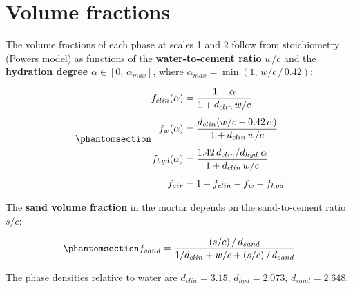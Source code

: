 \documentclass[
  a4paper,
  numbers=noendperiod,
  DIV=12]{scrreprt}
\begin{document}
\section{Volume fractions}\label{sec-pichler-volfracs}

The volume fractions of each phase at scales 1 and 2 follow from
stoichiometry (Powers model) as functions of the \textbf{water-to-cement
ratio} \(w/c\) and the \textbf{hydration degree}
\(\alpha \in [0,\,\alpha_{max}]\), where
\(\alpha_{max} = \min(1,\, w/c\,/\,0.42)\):

\begin{equation}\protect\phantomsection\label{eq-volfracs-cp}{
\begin{aligned}
f_{clin}(\alpha) &= \frac{1-\alpha}{1+d_{clin}\,w/c} \\[4pt]
f_w(\alpha) &= \frac{d_{clin}(w/c - 0.42\,\alpha)}{1+d_{clin}\,w/c} \\[4pt]
f_{hyd}(\alpha) &= \frac{1.42\,d_{clin}/d_{hyd}\;\alpha}{1+d_{clin}\,w/c} \\[4pt]
f_{air} &= 1 - f_{clin} - f_w - f_{hyd}
\end{aligned}
}\end{equation}

The \textbf{sand volume fraction} in the mortar depends on the
sand-to-cement ratio \(s/c\):

\begin{equation}\protect\phantomsection\label{eq-volfracs-mo}{
f_{sand} = \frac{(s/c)\,/\,d_{sand}}{1/d_{clin} + w/c + (s/c)\,/\,d_{sand}}
}\end{equation}

The phase densities relative to water are \(d_{clin}=3.15\),
\(d_{hyd}=2.073\), \(d_{sand}=2.648\).
\end{document}

